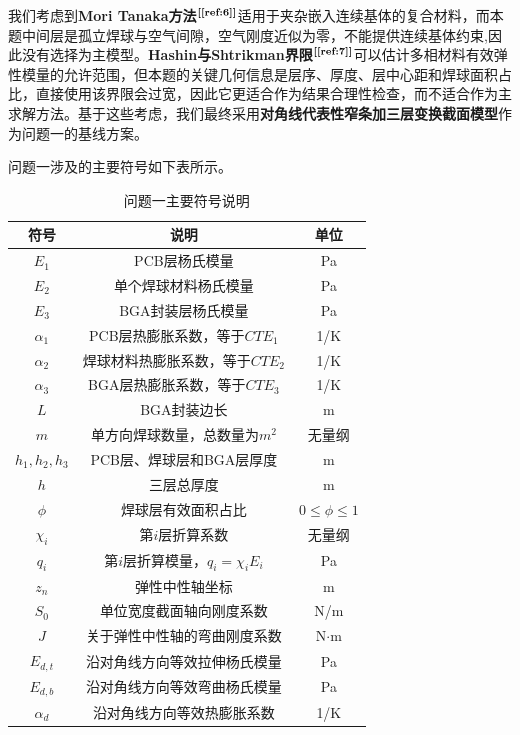 \documentclass[draft,12pt,a4paper]{ctexart}
\theoremstyle{definition}
\begin{document}
我们考虑到\textbf{Mori Tanaka方法}$^{\textbf{[\ref{ref:6}]}}$适用于夹杂嵌入连续基体的复合材料，而本题中间层是孤立焊球与空气间隙，空气刚度近似为零，不能提供连续基体约束,因此没有选择为主模型。\textbf{Hashin与Shtrikman界限}$^{\textbf{[\ref{ref:7}]}}$可以估计多相材料有效弹性模量的允许范围，但本题的关键几何信息是层序、厚度、层中心距和焊球面积占比，直接使用该界限会过宽，因此它更适合作为结果合理性检查，而不适合作为主求解方法。基于这些考虑，我们最终采用\textbf{对角线代表性窄条加三层变换截面模型}作为问题一的基线方案。

问题一涉及的主要符号如下表所示。

\begin{table}[H]\centering
  \caption{问题一主要符号说明}\label{tab:symbol-q1}
  \small
  \begin{tabular}{ccc}
    \toprule
    符号 & 说明 & 单位 \\
    \midrule
    $E_1$ & PCB层杨氏模量 & Pa \\
    $E_2$ & 单个焊球材料杨氏模量 & Pa \\
    $E_3$ & BGA封装层杨氏模量 & Pa \\
    $\alpha_1$ & PCB层热膨胀系数，等于$CTE_1$ & 1/K \\
    $\alpha_2$ & 焊球材料热膨胀系数，等于$CTE_2$ & 1/K \\
    $\alpha_3$ & BGA层热膨胀系数，等于$CTE_3$ & 1/K \\
    $L$ & BGA封装边长 & m \\
    $m$ & 单方向焊球数量，总数量为$m^2$ & 无量纲 \\
    $h_1,h_2,h_3$ & PCB层、焊球层和BGA层厚度 & m \\
    $h$ & 三层总厚度 & m \\
    $\phi$ & 焊球层有效面积占比 & $0 \leq \phi \leq 1$ \\
    $\chi_i$ & 第$i$层折算系数 & 无量纲 \\
    $q_i$ & 第$i$层折算模量，$q_i=\chi_i E_i$ & Pa \\
    $z_n$ & 弹性中性轴坐标 & m \\
    $S_0$ & 单位宽度截面轴向刚度系数 & N/m \\
    $J$ & 关于弹性中性轴的弯曲刚度系数 & N$\cdot$m \\
    $E_{d,t}$ & 沿对角线方向等效拉伸杨氏模量 & Pa \\
    $E_{d,b}$ & 沿对角线方向等效弯曲杨氏模量 & Pa \\
    $\alpha_d$ & 沿对角线方向等效热膨胀系数 & 1/K \\
    \bottomrule
  \end{tabular}
\end{table}
\end{document}
